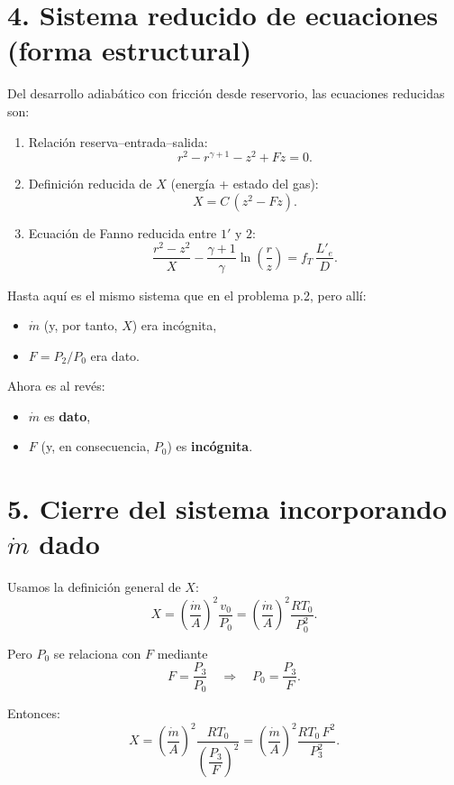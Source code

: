 \documentclass[11pt,a4paper]{article}
\begin{document}
\section*{4. Sistema reducido de ecuaciones (forma estructural)}

Del desarrollo adiabático con fricción desde reservorio, las ecuaciones reducidas son:

\begin{enumerate}
  \item Relación reserva--entrada--salida:
  \[
  r^2 - r^{\gamma+1} - z^2 + Fz = 0.
  \]

  \item Definición reducida de $X$ (energía + estado del gas):
  \[
  X = C\,(z^2 - Fz).
  \]

  \item Ecuación de Fanno reducida entre $1'$ y $2$:
  \[
  \frac{r^2 - z^2}{X}
  - \frac{\gamma+1}{\gamma}\ln\left(\frac{r}{z}\right)
  = f_T\,\frac{L'_e}{D}.
  \]
\end{enumerate}

Hasta aquí es el mismo sistema que en el problema p.2, pero allí:

\begin{itemize}
  \item $\dot m$ (y, por tanto, $X$) era incógnita,
  \item $F = P_2/P_0$ era dato.
\end{itemize}

Ahora es al revés:

\begin{itemize}
  \item $\dot m$ es \textbf{dato},
  \item $F$ (y, en consecuencia, $P_0$) es \textbf{incógnita}.
\end{itemize}

\section*{5. Cierre del sistema incorporando \texorpdfstring{$\dot m$}{m punto} dado}

Usamos la definición general de $X$:
\[
X = \left(\frac{\dot m}{A}\right)^2 \frac{v_0}{P_0}
  = \left(\frac{\dot m}{A}\right)^2 \frac{R T_0}{P_0^2}.
\]

Pero $P_0$ se relaciona con $F$ mediante
\[
F = \frac{P_3}{P_0}
\quad\Rightarrow\quad
P_0 = \frac{P_3}{F}.
\]

Entonces:
\[
X = \left(\frac{\dot m}{A}\right)^2
    \frac{R T_0}{\left(\dfrac{P_3}{F}\right)^2}
  = \left(\frac{\dot m}{A}\right)^2
    \frac{R T_0\,F^2}{P_3^2}.
\]
\end{document}
